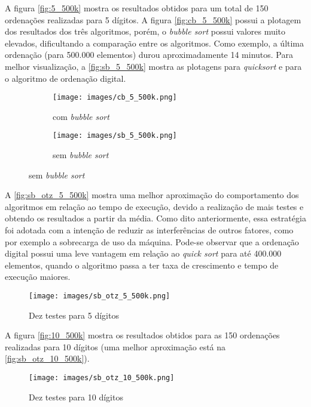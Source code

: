 \documentclass[12pt]{article}
\begin{document}
A figura \autoref{fig:5_500k} mostra os resultados obtidos para um total de 150 ordenações realizadas para 5 dígitos. A figura \autoref{fig:cb_5_500k} possui a plotagem dos resultados dos três algoritmos, porém, o \textit{bubble sort} possui valores muito elevados, dificultando a comparação entre os algoritmos. Como exemplo, a última ordenação (para 500.000 elementos) durou aproximadamente 14 minutos. Para melhor visualização, a \autoref{fig:sb_5_500k} mostra as plotagens para \textit{quicksort} e para o algoritmo de ordenação digital.   

\begin{figure}[]
	\centering
	\caption{Três testes para 5 dígitos}
	\begin{subfigure}[H]{0.8\textwidth}
		\centering
		\texttt{[image: images/cb\_5\_500k.png]}
		\caption{com \textit{bubble sort}}
		\label{fig:cb_5_500k}
	\end{subfigure}
	\begin{subfigure}[H]{0.8\textwidth}
		\centering
		\texttt{[image: images/sb\_5\_500k.png]}
		\caption{sem \textit{bubble sort}}
		\label{fig:sb_5_500k}
	\end{subfigure}
	\label{fig:5_500k}
\end{figure}

A \autoref{fig:sb_otz_5_500k} mostra uma melhor aproximação do comportamento dos algoritmos em relação ao tempo de execução, devido a realização de mais testes e obtendo os resultados a partir da média. Como dito anteriormente, essa estratégia foi adotada com a intenção de reduzir as interferências de outros fatores, como por exemplo a sobrecarga de uso da máquina. Pode-se observar que a ordenação digital possui uma leve vantagem em relação ao \textit{quick sort} para até 400.000 elementos, quando o algoritmo passa a ter taxa de crescimento e tempo de execução maiores.

\begin{figure}[h]
	\centering
	\caption{Dez testes para 5 dígitos}
	\texttt{[image: images/sb\_otz\_5\_500k.png]}
	\label{fig:sb_otz_5_500k}
\end{figure}

A figura \autoref{fig:10_500k} mostra os resultados obtidos para as 150 ordenações realizadas para 10 dígitos (uma melhor aproximação está na \autoref{fig:sb_otz_10_500k}). 

\begin{figure}[h!]
	\centering
	\caption{Dez testes para 10 dígitos}
	\texttt{[image: images/sb\_otz\_10\_500k.png]}
	\label{fig:sb_otz_10_500k}
\end{figure}
\end{document}

